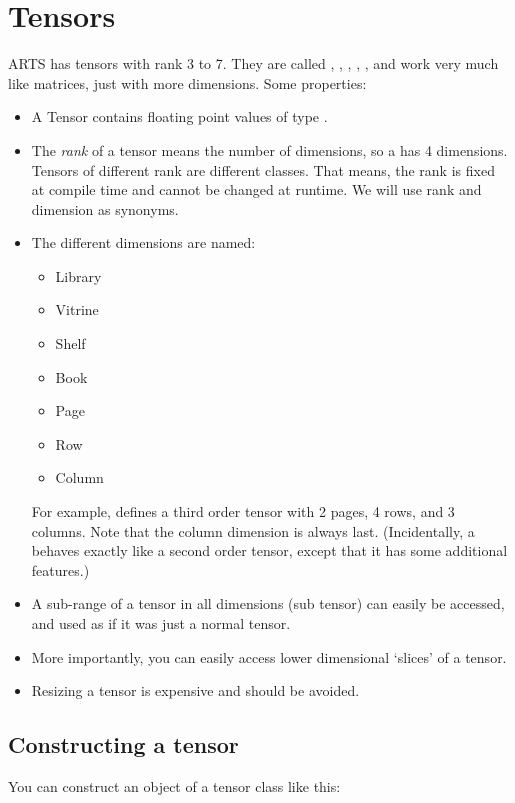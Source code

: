 \section{Tensors}
\label{sec:matpack:tensors}

ARTS has tensors with rank 3 to 7. They are called
, , ,
, , and work very much like
matrices, just with more dimensions. Some properties:
\begin{itemize}
\item A Tensor contains floating point values of type .
\item The \emph{rank} of a tensor means the number of dimensions, so a
   has 4 dimensions. Tensors of different rank are
  different classes. That means, the rank is fixed at compile time and
  cannot be changed at runtime. We will use rank and dimension as
  synonyms. 
\item The different dimensions are named:
\begin{itemize}
\item Library
\item Vitrine
\item Shelf
\item Book
\item Page
\item Row
\item Column
\end{itemize}
For example,  defines a third order tensor with 2
pages, 4 rows, and 3 columns. Note that the column dimension is always
last. (Incidentally, a  behaves exactly like a second
order tensor, except that it has some additional features.) 
\item A sub-range of a tensor in all dimensions (sub tensor) can
  easily be accessed, and used as if it was just a normal tensor.
\item More importantly, you can easily access lower dimensional
  `slices' of a tensor. 
\item Resizing a tensor is expensive and should be avoided.
\end{itemize}

\subsection{Constructing a tensor}
You can construct an object of a tensor class like this:

